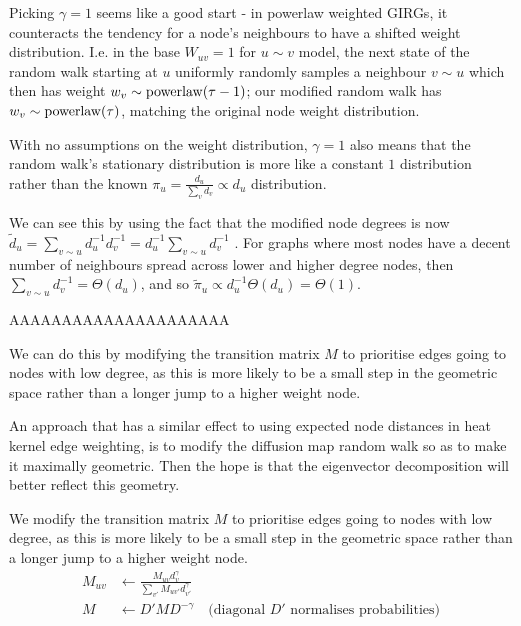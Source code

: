 Picking $\gamma=1$ seems like a good start - in powerlaw weighted GIRGs, it counteracts the tendency for a node's neighbours to have a shifted weight distribution. I.e. in the base $W_{uv} = 1$ for $u \sim v$  model, the next state of the random walk starting at $u$ uniformly randomly samples a neighbour $v \sim u$ which then has weight $w_v \sim \operatorname{powerlaw}(\tau - 1)$; our modified random walk has $w_v \sim \operatorname{powerlaw}(\tau)$, matching the original node weight distribution. 

With no assumptions on the weight distribution, $\gamma=1$ also means that the random walk's stationary distribution is more like a constant $1$ distribution rather than the known $\pi_u = \frac{d_u}{\sum_v d_v} \propto d_u$ distribution.

We can see this by using the fact that the modified node degrees is now $\tilde{d}_u = \sum_{v \sim u} d_u^{-1} d_v^{-1} = d_u^{-1} \sum_{v \sim u} d_v^{-1}$
.
For graphs where most nodes have a decent number of neighbours spread across lower and higher degree nodes, then $\sum_{v \sim u} d_v^{-1} = \Theta(d_u)$, and so $\tilde{\pi}_u \propto d_u^{-1} \Theta(d_u) = \Theta(1)$.


AAAAAAAAAAAAAAAAAAAAA




We can do this by modifying the transition matrix $M$ to prioritise edges going to nodes with low degree, as this is more likely to be a small step in the geometric space rather than a longer jump to a higher weight node.

An approach that has a similar effect to using expected node distances in heat kernel edge weighting, is to modify the diffusion map random walk so as to make it maximally geometric. Then the hope is that the eigenvector decomposition will better reflect this geometry.

We modify the transition matrix $M$ to prioritise edges going to nodes with low degree, as this is more likely to be a small step in the geometric space rather than a longer jump to a higher weight node. 
\begin{align*}
  M_{uv} &\gets \frac{M_{uv} {d_v^\gamma}}{\sum_{v'} M_{uv'} {d_{v'}^\gamma}}
  \\
  M &\gets D' M D^{-\gamma} \quad \text{(diagonal $D'$ normalises probabilities)}
\end{align*}





